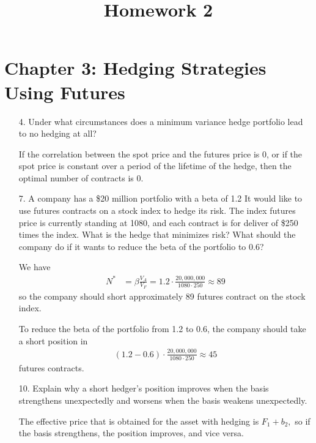 \documentclass{article}
\begin{document}
\title{Homework 2}
\maketitle
\thispagestyle{fancy}

\section*{Chapter 3: Hedging Strategies Using Futures}

\begin{itemize}
	\item[4.] Under what circumstances does a minimum variance hedge portfolio lead to no hedging at all?
		\begin{answer*}
			If the correlation between the spot price and the futures price is 0, or if the spot price is constant over a period of the lifetime of the hedge, then the optimal number of contracts is 0.
		\end{answer*}

	\item[7.] A company has a \$20 million portfolio with a beta of 1.2 It would like to use futures contracts on a stock index to hedge its risk. The index futures price is currently standing at 1080, and each contract is for deliver of \$250 times the index. What is the hedge that minimizes risk? What should the company do if it wants to reduce the beta of the portfolio to 0.6?
		\begin{soln}
			We have
			\begin{align*}
				N^* &= \beta\frac{V_A}{V_F} = 1.2\cdot \frac{20, 000, 000}{1080\cdot 250} \approx 89
			\end{align*}
			so the company should short approximately 89 futures contract on the stock index. 

			To reduce the beta of the portfolio from 1.2 to 0.6, the company should take a short position in
			\begin{align*}
				(1.2-0.6)\cdot \frac{20, 000, 000}{1080\cdot 250} \approx 45
			\end{align*}
			futures contracts.
		\end{soln}

	\item[10.] Explain why a short hedger's position improves when the basis strengthens unexpectedly and worsens when the basis weakens unexpectedly.
		\begin{answer*}
			The effective price that is obtained for the asset with hedging is $F_1+b_2,$ so if the basis strengthens, the position improves, and vice versa.
		\end{answer*}


\end{itemize}
\end{document}
